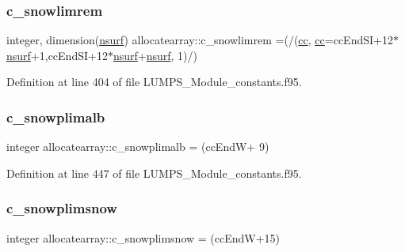 \mbox{\label{namespaceallocatearray_aabfc6114ca3ad63415f899086be4f8ed}} 
\subsubsection{\texorpdfstring{c\+\_\+snowlimrem}{c\_snowlimrem}}
{\footnotesize\ttfamily integer, dimension(\hyperlink{namespaceallocatearray_acd22f92a06f7e9a2a91426b3dc99fdb0}{nsurf}) allocatearray\+::c\+\_\+snowlimrem =(/(\hyperlink{namespaceallocatearray_ac863c81704eb507dee10f5e10741e10c}{cc}, \hyperlink{namespaceallocatearray_ac863c81704eb507dee10f5e10741e10c}{cc}=cc\+End\+SI+12$\ast$\hyperlink{namespaceallocatearray_acd22f92a06f7e9a2a91426b3dc99fdb0}{nsurf}+1,cc\+End\+SI+12$\ast$\hyperlink{namespaceallocatearray_acd22f92a06f7e9a2a91426b3dc99fdb0}{nsurf}+\hyperlink{namespaceallocatearray_acd22f92a06f7e9a2a91426b3dc99fdb0}{nsurf}, 1)/)}



Definition at line 404 of file L\+U\+M\+P\+S\+\_\+\+Module\+\_\+constants.\+f95.

\mbox{\label{namespaceallocatearray_a29849c819c360ae6df83cd8bd1a15b69}} 
\subsubsection{\texorpdfstring{c\+\_\+snowplimalb}{c\_snowplimalb}}
{\footnotesize\ttfamily integer allocatearray\+::c\+\_\+snowplimalb = (cc\+EndW+ 9)}



Definition at line 447 of file L\+U\+M\+P\+S\+\_\+\+Module\+\_\+constants.\+f95.

\mbox{\label{namespaceallocatearray_a1a9bfdeb2c6ae724ce49d9bb942e84bb}} 
\subsubsection{\texorpdfstring{c\+\_\+snowplimsnow}{c\_snowplimsnow}}
{\footnotesize\ttfamily integer allocatearray\+::c\+\_\+snowplimsnow = (cc\+EndW+15)}



